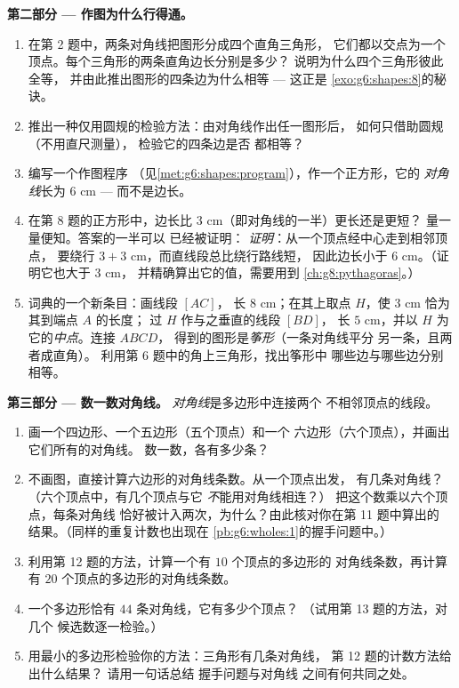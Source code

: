 \begin{problem}
\medskip
\noindent\textbf{第二部分 --- 作图为什么行得通。}
\begin{enumerate}[resume]
  \item 在第 2 题中，两条对角线把图形分成四个直角三角形，
        它们都以交点为一个顶点。每个三角形的两条直角边长分别是多少？
        说明为什么四个三角形彼此全等，
        并由此推出图形的四条边为什么相等 ---
        这正是
        \cref{exo:g6:shapes:8}的秘诀。
  \item 推出一种仅用圆规的检验方法：由对角线作出任一图形后，
        如何只借助圆规（不用直尺测量），
        检验它的四条边是否
        都相等？
  \item 编写一个作图程序
        （见\cref{met:g6:shapes:program}），作一个正方形，它的
        \emph{对角线}长为 $6$ cm --- 而不是边长。
  \item 在第 8 题的正方形中，边长比 $3$ cm（即对角线的一半）更长还是更短？
        量一量便知。答案的一半可以
        已经被证明：
        \emph{证明}：从一个顶点经中心走到相邻顶点，
        要绕行 $3 + 3$ cm，而直线段总比绕行路线短，
        因此边长小于
        $6$ cm。（证明它也大于 $3$ cm，
        并精确算出它的值，需要用到
        \cref{ch:g8:pythagoras}。）
  \item 词典的一个新条目：画线段 $[AC]$，
        长 $8$ cm；在其上取点 $H$，使 $3$ cm 恰为其到端点 $A$ 的长度；
        过 $H$ 作与之垂直的线段 $[BD]$，
        长 $5$ cm，并以 $H$ 为它的\emph{中点}。连接 $ABCD$，
        得到的图形是\emph{筝形}（一条对角线平分
        另一条，且两者成直角）。
        利用第 6 题中的角上三角形，找出筝形中
        哪些边与哪些边分别相等。
\end{enumerate}

\medskip
\noindent\textbf{第三部分 --- 数一数对角线。}
\emph{对角线}是多边形中连接两个
不相邻顶点的线段。
\begin{enumerate}[resume]
  \item 画一个四边形、一个五边形（五个顶点）和一个
        六边形（六个顶点），并画出它们所有的对角线。
        数一数，各有多少条？
  \item 不画图，直接计算六边形的对角线条数。从一个顶点出发，
        有几条对角线？（六个顶点中，有几个顶点与它
        \emph{不}能用对角线相连？）
        把这个数乘以六个顶点，每条对角线
        恰好被计入两次，为什么？由此核对你在第 11 题中算出的
        结果。（同样的重复计数也出现在
        \cref{pb:g6:wholes:1}的握手问题中。）
  \item 利用第 12 题的方法，计算一个有 $10$ 个顶点的多边形的
        对角线条数，再计算有 $20$ 个顶点的多边形的对角线条数。
  \item 一个多边形恰有 $44$ 条对角线，它有多少个顶点？
        （试用第 13 题的方法，对几个
        候选数逐一检验。）
  \item 用最小的多边形检验你的方法：三角形有几条对角线，
        第 12 题的计数方法给出什么结果？
        请用一句话总结
        握手问题与对角线
        之间有何共同之处。
\end{enumerate}
\end{problem}
